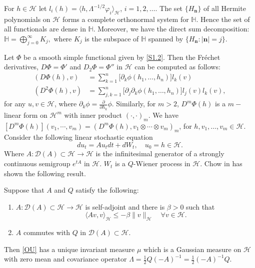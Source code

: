 \documentclass[review,onefignum,onetabnum]{siamart190516}
\begin{document}
\begin{lemma}\label{s1.le1}
        For $h\in\mathcal{H}  $ let $l_i(h)=\langle h,  \Lambda^{-1/2}\varphi_i
    \rangle_\mathcal{H}$, $ i=1,2,\ldots$. The set $\{H_{\bm{n}}\}$ of all
    Hermite polynomials on $\mathcal{H} $ forms a complete orthonormal system
    for $\mathbb{H} $. Hence the set of all functionals are dense in
    $\mathbb{H}$. Moreover, we have the direct sum decomposition:
    $
        \mathbb{H} = \bigoplus_{j=0}^\infty K_j,
    $
    where $K_j$ is the subspace of $\mathbb{H} $ spanned by $\{H_{\bm{n}}:
    |\bm{n}|=j\}$.
\end{lemma}
%
Let $\Phi$ be a smooth simple functional given by \eqref{S1.2}. Then the
Fr\'echet derivatives, $D \Phi = \Phi'$ and $D_2 \Phi = \Phi''$ in
$\mathcal{H}$ can be computed as follows:
\begin{equation}
    \label{s1.3}
    \begin{aligned}
        (D \Phi(h), v)
        &=
            \sum_{k=1}^n \big[\partial_k \phi(h_1,\ldots,h_n)\big]
            l_k(v)\nonumber
        \\
        (D^2 \Phi(h), v)
        &=
            \sum_{j,k=1}^n \big[\partial_j\partial_k
            \phi(h_1,\ldots,h_n)\big] l_j(v) l_k(v),
    \end{aligned}
\end{equation}
for any $u, v \in \mathcal{H}$, where
$\partial_k \phi= \frac{\partial}{\partial h_k} \phi$.
Similarly, for $m > 2$, $D^m \Phi(h)$ is a $m-$linear form on $\mathcal{H}^m$
with inner product $(\cdot,\cdot)_m$.
We have
$
    [D^m\Phi(h) ](v_1 , \cdots, v_m )
        = (D^m \Phi(h), v_1 \otimes \cdots \otimes v_m )_m
$,
for $h, v_1 , \ldots , v_m \in \mathcal{H}$.
Consider the following linear stochastic equation
\begin{equation}
    \label{OU}
    du_t=Au_tdt+dW_t, \quad 
    u_0=h\in \mathcal{H}.
\end{equation}
Where $A: \mathcal{D}(A) \subset \mathcal{H} \rightarrow \mathcal{H}$ is the
infinitesimal generator of a strongly continuous semigroup $e^{tA}$ in
$\mathcal{H}$. $W_t$ is a $Q$-Wiener process
in $\mathcal{H}$. Chow in \cite[Lemma 9.4.1]{liu} has shown the following
result.
\begin{lemma} \label{lemma-AQ}
    Suppose that $A$ and $Q$ satisfy the following:
    \begin{enumerate}
        \item
            $A:\mathcal{D}(A)\subset \mathcal{H}\rightarrow \mathcal{H}$ is
            self-adjoint and there is $\beta>0$ such that
            \[
                \langle Av,v\rangle_ \mathcal{H}\le -\beta\|v
                \|_\mathcal{H}\quad
                \forall v\in \mathcal{H}.
            \]
        \item $A$ commutes with $Q$ in $\mathcal{D}(A)\subset \mathcal{H}$.
    \end{enumerate}
    Then \eqref{OU} has a unique invariant measure $\mu$ which is a Gaussian
    measure on $ \mathcal{H}$ with zero mean and covariance
    operator
    $
        \Lambda=
            \tfrac{1}{2}Q(-A)^{-1}
            =\tfrac{1}{2}(-A)^{-1}Q
    $.
\end{lemma}
\end{document}
